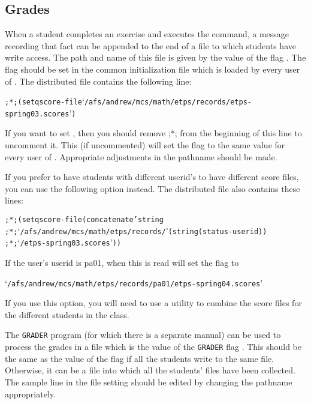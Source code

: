 \subsection{Grades}


When a student completes an
exercise and executes the  command,
a message recording that fact can be appended to the end of a
file to which students have write access.
The path and name of this file
is given by the value of the flag .
The flag  should be set in
the common initialization file 
which is loaded by every user of {\ETPS}.
The distributed  file contains the
following line:
\begin{alltt}
;*; (setq score-file `/afs/andrew/mcs/math/etps/records/etps-spring03.scores')
\end{alltt}
If you want  to set ,
then you should remove ;*;
from the beginning of this line to uncomment it.
This (if uncommented) will set the flag 
to the same value for every user of {\ETPS}.
Appropriate adjustments in the pathname should be made.

If you prefer to have students with different userid's
to have different score files, you can use
the following option instead.
The distributed  file also contains these lines:
\begin{alltt}
;*; (setq score-file (concatenate 'string
;*;     `/afs/andrew/mcs/math/etps/records/' (string (status-userid))
;*;     `/etps-spring03.scores'))
\end{alltt}
If the user's userid is pa01, when this is read {\ETPS}
will set the flag  to
\begin{alltt}
`/afs/andrew/mcs/math/etps/records/pa01/etps-spring04.scores'
\end{alltt}
If you use this option, you will need to use a utility
to combine the score files for the different students in
the class.

The {\tt GRADER} program (for which there is a separate manual)
can be used to process the
grades in a file which is the value of the
{\tt GRADER} flag .
This should be the same as the value of
the {\ETPS} flag 
if all the students write to the same file.
Otherwise, it can be a file into which all the
students' files have been collected.
The sample line in the 
file setting  should be edited
by changing the pathname appropriately.

